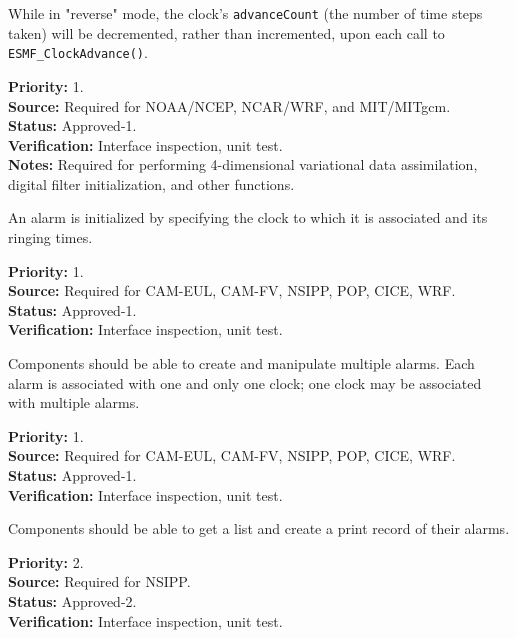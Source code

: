 While in "reverse" mode, the clock's {\tt advanceCount} (the number of time steps taken) will be decremented, rather than incremented, upon each call to {\tt ESMF\_ClockAdvance()}.
\begin{reqlist}
{\bf Priority:} 1. \\
{\bf Source:} Required for NOAA/NCEP, NCAR/WRF, and MIT/MITgcm. \\
{\bf Status:} Approved-1. \\
{\bf Verification:} Interface inspection, unit test. \\
{\bf Notes:} Required for performing 4-dimensional variational data assimilation, digital filter initialization, and other functions.
\end{reqlist}

\label{req:alarms}

An alarm is initialized by specifying the clock to which it is associated 
and its ringing times. 
\begin{reqlist}
{\bf Priority:} 1. \\
{\bf Source:} Required for CAM-EUL, CAM-FV, NSIPP, POP, CICE, WRF. \\
{\bf Status:} Approved-1. \\
{\bf Verification:} Interface inspection, unit test. 
\end{reqlist}

Components should be able to create and manipulate multiple alarms.
Each alarm is associated with one and only one clock; one clock may
be associated with multiple alarms.
\begin{reqlist}
{\bf Priority:} 1. \\
{\bf Source:} Required for CAM-EUL, CAM-FV, NSIPP, POP, CICE, WRF. \\
{\bf Status:} Approved-1. \\
{\bf Verification:} Interface inspection, unit test. 
\end{reqlist}

Components should be able to get a list and create a print record of their alarms.
\begin{reqlist}
{\bf Priority:} 2. \\
{\bf Source:} Required for NSIPP. \\
{\bf Status:} Approved-2. \\
{\bf Verification:} Interface inspection, unit test. 
\end{reqlist}


